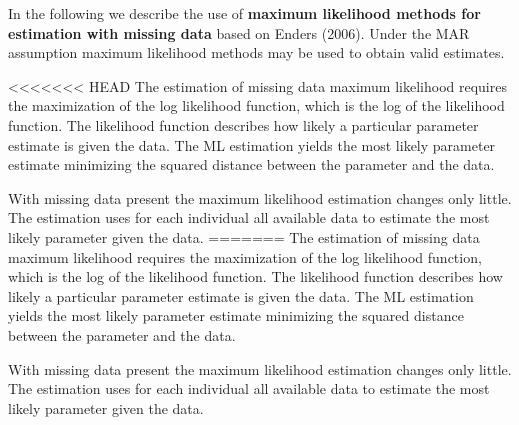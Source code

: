 In the following we describe the use of \textbf{maximum likelihood methods for estimation with missing data} based on Enders (2006). 
Under the MAR assumption maximum likelihood methods may be used to obtain valid estimates. \par
<<<<<<< HEAD
 The estimation of missing data maximum likelihood requires the maximization of the log likelihood function, which is the log of the likelihood function. The likelihood function describes how likely a particular parameter estimate is given the data. The ML estimation yields the most likely parameter estimate minimizing the squared distance between the parameter and the data. \par With missing data present the maximum likelihood estimation changes only little. The estimation uses for each individual all available data to estimate the most likely parameter given the data.  
=======
 The estimation of missing data maximum likelihood requires the maximization of the log likelihood function, which is the log of the likelihood function. The likelihood function describes how likely a particular parameter estimate is given the data. The ML estimation yields the most likely parameter estimate minimizing the squared distance between the parameter and the data. \par With missing data present the maximum likelihood estimation changes only little. The estimation uses for each individual all available data to estimate the most likely parameter given the data.


\endinput
>>>>>>> refs/remotes/origin/master
